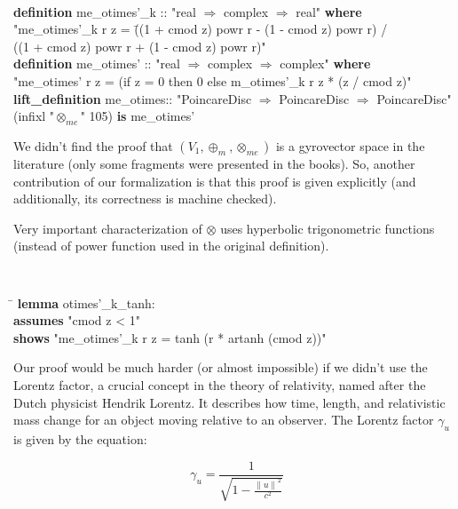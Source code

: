 \documentclass[a4paper]{article}
\newcommand{\tab}{\hspace{5mm}}
\theoremstyle{definition}
\newcommand{\norm}[1]{\left\lVert#1\right\rVert}
\begin{document}
{\tt
\begin{small}
\begin{tabbing}
{\bf definition}  me\_otimes'\_k  :: "real $\Rightarrow$ complex $\Rightarrow$ real" {\bf where}\\
\tab "me\_otimes'\_k r z = \=((1 + cmod z) powr r - (1 - cmod z) powr r) /\\
\>                  ((1 + cmod z) powr r + (1 - cmod z) powr r)"\\ 
{\bf definition} me\_otimes' :: "real $\Rightarrow$ complex $\Rightarrow$ complex" {\bf where}\\
\tab "me\_otimes' r z = (if z = 0 then 0 else m\_otimes'\_k r z * (z / cmod z)"\\
{\bf lift\_definition} me\_otimes:: "PoincareDisc $\Rightarrow$ PoincareDisc $\Rightarrow$ PoincareDisc" \\
\tab (infixl "$\otimes_{me}$" 105) {\bf is} me\_otimes'
\end{tabbing}
\end{small}
}

We didn't find the proof that $(V_1, \oplus_m, \otimes_{me})$ is a
gyrovector space in the literature (only some fragments were presented
in the books\cite{ungar-analytic}). So, another contribution of our
formalization is that this proof is given explicitly (and
additionally, its correctness is machine checked).

Very important characterization of $\otimes$ uses hyperbolic
trigonometric functions (instead of power function used in the
original definition).

{\tt
\begin{small}
\begin{tabbing}
\hspace{5mm}\=\kill
{\bf lemma} otimes'\_k\_tanh:\\
\>  {\bf assumes} "cmod z < 1"\\
\>  {\bf shows} "me\_otimes'\_k r z = tanh (r * artanh (cmod z))"
\end{tabbing}
\end{small}
}


Our proof would be much harder (or almost impossible) if we didn't use
the Lorentz factor, a crucial concept in the theory of relativity,
named after the Dutch physicist Hendrik Lorentz. It describes how
time, length, and relativistic mass change for an object moving
relative to an observer. The Lorentz factor $\gamma_u$ is given by the
equation:

$$\gamma_u = \frac{1}{\sqrt{1-\frac{\norm{u}^2}{c^2}}}$$
\end{document}
